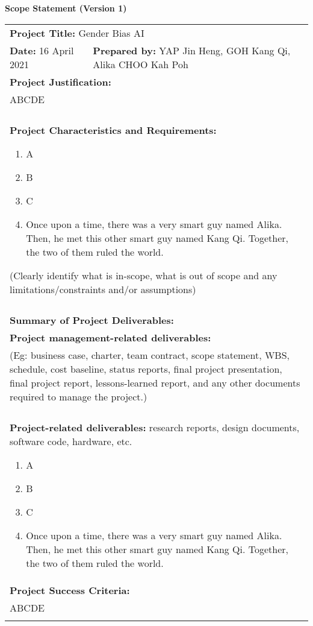 \begin{center}
    \textbf{Scope Statement (Version 1)}
\end{center}

\begin{longtable}{ | p{} l | }
    \hline
    \multicolumn{2}{|l|}{\textbf{Project Title:} Gender Bias AI} \\
    \textbf{Date:} 16 April 2021 &
    \textbf{Prepared by:} YAP Jin Heng, GOH Kang Qi, Alika CHOO Kah Poh \\
    \hline
    \multicolumn{2}{|l|}{\textbf{Project Justification:}} \\
    \multicolumn{2}{|p{\textwidth}|}{ABCDE} \\
    & \\
    \hline
    \multicolumn{2}{|p{\textwidth}|}{\textbf{Project Characteristics and Requirements:}
        \begin{enumerate}
            \item A
            \item B
            \item C
            \item Once upon a time, there was a very smart guy named Alika. Then, he met this other smart guy named Kang Qi. Together, the two of them ruled the world.
        \end{enumerate}
    (Clearly identify what is in-scope, what is out of scope and any limitations/constraints and/or assumptions)
    } \\
    & \\
    \hline
    \multicolumn{2}{|l|}{\textbf{Summary of Project Deliverables:}} \\
    \multicolumn{2}{|l|}{\textbf{Project management-related deliverables:}} \\
    \multicolumn{2}{|p{\textwidth}|}{(Eg: business case, charter, team contract, scope statement, WBS, schedule, cost baseline, status reports, final project presentation, final project report, lessons-learned report, and any other documents required to manage the project.)} \\
    & \\
    \multicolumn{2}{|p{\textwidth}|}{\textbf{Project-related deliverables:} research reports, design documents, software code, hardware, etc.
        \begin{enumerate}
            \item A
            \item B
            \item C
            \item Once upon a time, there was a very smart guy named Alika. Then, he met this other smart guy named Kang Qi. Together, the two of them ruled the world.
        \end{enumerate}
    } \\
    \hline
    \multicolumn{2}{|l|}{\textbf{Project Success Criteria:}} \\
    \multicolumn{2}{|p{\textwidth}|}{ABCDE} \\
    & \\
    \hline
\end{longtable}
